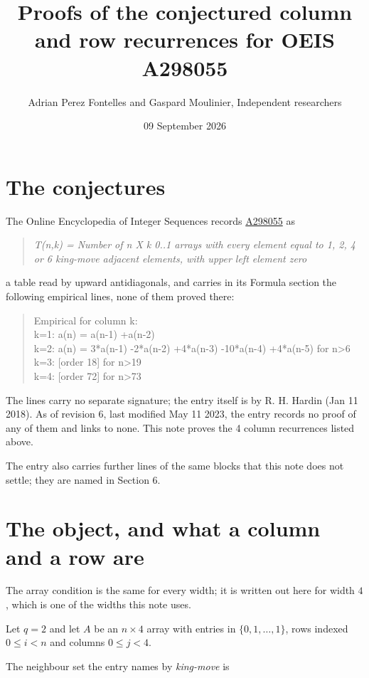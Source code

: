 \documentclass[11pt]{article}
\title{Proofs of the conjectured column and row recurrences for OEIS A298055}
\author{Adrian Perez Fontelles and Gaspard Moulinier, Independent researchers}
\date{09 September 2026}
\theoremstyle{definition}
\begin{document}
\maketitle
\section{The conjectures}

The Online Encyclopedia of Integer Sequences records \href{https://oeis.org/A298055}{A298055} as

\begin{quote}\itshape T(n,k) = Number of n X k 0..1 arrays with every element equal to 1, 2, 4 or 6 king-move adjacent elements, with upper left element zero\end{quote}

a table read by upward antidiagonals, and carries in its Formula section the following empirical lines, none of them proved there:

\begin{quote}\ttfamily Empirical for column k:\\
k=1: a(n) = a(n-1) +a(n-2)\\k=2: a(n) = 3*a(n-1) -2*a(n-2) +4*a(n-3) -10*a(n-4) +4*a(n-5) for n>6\\k=3: [order 18] for n>19\\k=4: [order 72] for n>73\end{quote}

The lines carry no separate signature; the entry itself is by R. H. Hardin (Jan 11 2018). As of revision 6, last modified May 11 2023, the entry records no proof of any of them and links to none. This note proves the 4 column recurrences listed above.

The entry also carries further lines of the same blocks that this note does not settle; they are named in Section 6.

\section{The object, and what a column and a row are}

The array condition is the same for every width; it is written out here for width $4$, which is one of the widths this note uses.

Let $q = 2$ and let $A$ be an $n \times 4$ array with entries in $\{0,1,\dots,1\}$, rows indexed $0 \le i < n$ and columns $0 \le j < 4$.

The neighbour set the entry names by {\itshape king-move} is
\end{document}
